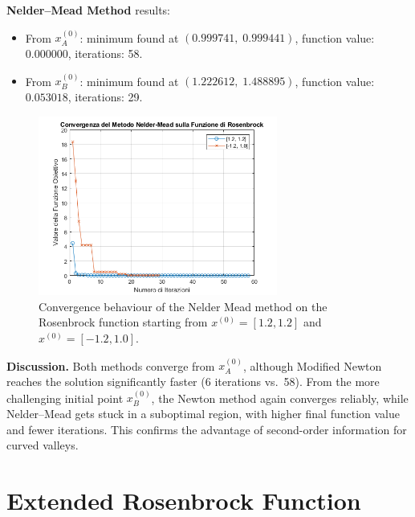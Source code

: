 \documentclass[a4paper,12pt]{article}
\begin{document}
	\newpage
	\vspace{1em}
	\textbf{Nelder–Mead Method} results:
	\begin{itemize}
		\item From \( x^{(0)}_A \):  
		minimum found at \( (0.999741,\;0.999441) \),  
		function value: \( 0.000000 \),  
		iterations: 58.
		\item From \( x^{(0)}_B \):  
		minimum found at \( (1.222612,\;1.488895) \),  
		function value: \( 0.053018 \),  
		iterations: 29.
	\end{itemize}
	
	\begin{figure}[htbp]
		\centering
		\includegraphics[width=0.7\textwidth]{../immagini/grafrosennelder.png}
		\caption{Convergence behaviour of the Nelder Mead method on the Rosenbrock function starting from $x^{(0)} = [1.2, 1.2]$ and $x^{(0)} = [-1.2, 1.0]$.}
		\label{fig:rosennewton}
	\end{figure}
	
	\vspace{1em}
	
	
	\vspace{1em}
	\textbf{Discussion.}  
	Both methods converge from \( x^{(0)}_A \), although Modified Newton reaches the solution significantly faster (6 iterations vs.\ 58). From the more challenging initial point \( x^{(0)}_B \), the Newton method again converges reliably, while Nelder–Mead gets stuck in a suboptimal region, with higher final function value and fewer iterations. This confirms the advantage of second-order information for curved valleys.
	
	 
	\newpage
	\section{Extended Rosenbrock Function}
	
\end{document}
